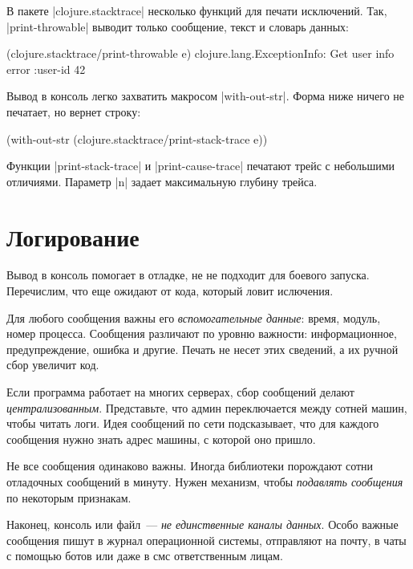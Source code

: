 В пакете \spverb|clojure.stacktrace| несколько функций для печати
исключений. Так, \spverb|print-throwable| выводит только сообщение, текст
и словарь данных:

\begin{english}
  \begin{clojure}
(clojure.stacktrace/print-throwable e)
clojure.lang.ExceptionInfo: Get user info error
{:user-id 42}
  \end{clojure}
\end{english}

Вывод в консоль легко захватить макросом \spverb|with-out-str|. Форма ниже
ничего не печатает, но вернет строку:

\begin{english}
  \begin{clojure}
(with-out-str
  (clojure.stacktrace/print-stack-trace e))
  \end{clojure}
\end{english}

Функции \spverb|print-stack-trace| и \spverb|print-cause-trace| печатают трейс с
небольшими отличиями. Параметр \spverb|n| задает максимальную глубину трейса.

\section{Логирование}

Вывод в консоль помогает в отладке, не не подходит для боевого
запуска. Перечислим, что еще ожидают от кода, который ловит ислючения.

Для любого сообщения важны его \emph{вспомогательные данные}: время, модуль,
номер процесса. Сообщения различают по уровню важности: информационное,
предупреждение, ошибка и другие. Печать не несет этих сведений, а их ручной сбор
увеличит код.

Если программа работает на многих серверах, сбор сообщений делают
\emph{централизованным}. Представьте, что админ переключается между сотней
машин, чтобы читать логи. Идея сообщений по сети подсказывает, что для каждого
сообщения нужно знать адрес машины, с которой оно пришло.

Не все сообщения одинаково важны. Иногда библиотеки порождают сотни отладочных
сообщений в минуту. Нужен механизм, чтобы \emph{подавлять сообщения} по
некоторым признакам.

Наконец, консоль или файл~--- \emph{не единственные каналы данных}. Особо важные
сообщения пишут в журнал операционной системы, отправляют на почту, в чаты с
помощью ботов или даже в смс ответственным лицам.

